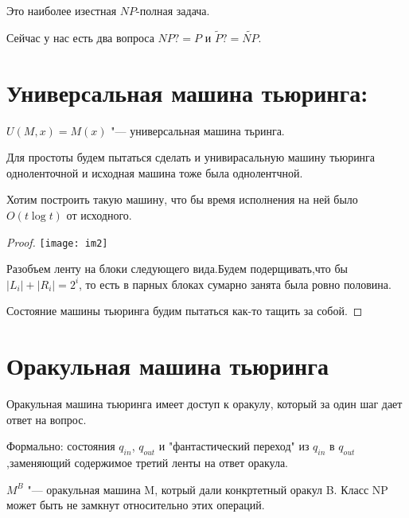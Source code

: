 Это наиболее изестная $NP$-полная задача. 

Сейчас у нас есть два вопроса $NP ?= P$ и $\tilde P ?= \tilde{NP}$.

\section{Универсальная машина тьюринга:}
\begin{Def}
$U(M, x) = M(x)$ "--- универсальная машина тьринга.
\end{Def}

Для простоты будем пытаться сделать и унивирасальную машину тьюринга одноленточной и исходная 
машина тоже была однолентчной. 

\begin{theorem}
Хотим построить такую машину, что бы время исполнения на ней было $O(t \log t)$ от исходного. 
\end{theorem}

\begin{proof}
\texttt{[image: im2]}

Разобъем ленту на блоки следующего вида.Будем подерщивать,что бы $|L_i| + |R_i| = 2^i$, 
то есть в парных блоках сумарно занята была ровно половина. 

Состояние машины тьюринга будим пытаться как-то тащить за собой. 
\end{proof}

\section{Оракульная машина тьюринга}
Оракульная машина тьюринга имеет доступ к оракулу, который за один шаг
дает ответ на вопрос. 

Формально: состояния $q_{in}$, $q_{out}$  и "фантастический переход" из 
$q_{in}$ в $q_{out}$,заменяющий содержимое третий ленты на ответ оракула. 

$M^B$ "--- оракульная машина M, котрый дали конкртетный оракул B. Класс NP может 
быть не замкнут относительно этих операций. 
